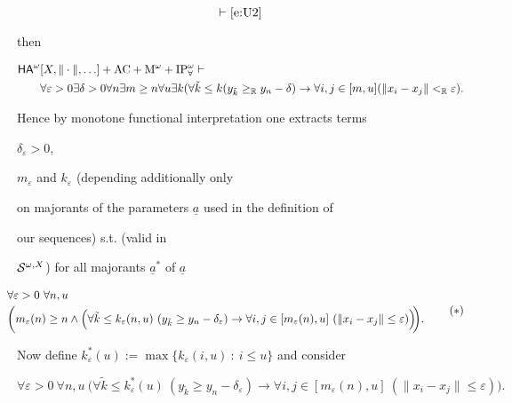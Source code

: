 \documentclass[1p]{elsarticle}
\newcommand{\usftext}[1]{\textsf{\upshape #1}}
\newcommand{\ba}{\begin{array}} \newcommand{\ea}{\end{array}}
\newcommand{\RR}{\ensuremath{\mathbb{R}}}
\newcommand{\ha}{\ensuremath{{\usftext{HA}}^\omega}} %
\theoremstyle{plain}
\theoremstyle{definition}
\theoremstyle{remark}
\renewcommand{\epsilon}{\varepsilon}
\theoremstyle{definition}
\begin{document}
{\[\vdash\text{\eqref{e:U2}}

\]

then

\begin{align*}

\ha&[X,\|\cdot\|,\ldots]+{\rm AC}+{\rm M}^{\omega} +{\rm IP}^\omega_\forall \vdash\\

&\forall\epsilon>0\exists\delta>0\forall n\exists m\geq n\forall u\exists k(\forall \tilde k\le k(y_{\tilde k}\geq_\RR y_n-\delta)

\rightarrow \forall i,j\in[m,u](\|x_i-x_j\|<_\RR\epsilon).

\end{align*}

Hence by monotone functional interpretation one extracts terms 

 $\delta_\epsilon>0$, 

$m_\epsilon$ and $k_\epsilon$ (depending additionally only 

on majorants of the parameters $\underline{a}$ used in the definition of 

our sequences) s.t. (valid in 

${\cal S}^{\omega,X}$) for all majorants $\underline{a}^*$ of $\underline{a}$ 

\[ \hspace*{-5mm} \ba{l} 

\forall \epsilon>0\ \forall n,u\\[1mm] 

\bigg( m_\epsilon(n)\ge n \wedge \Big(\forall \tilde k\le k_\epsilon(n,u)\ (y_{\tilde k}\geq y_n-\delta_\epsilon)\rightarrow 

 \forall i,j\in[m_\epsilon(n),u]\ (\|x_i-x_j\|\leq \epsilon) \Big)

\hspace*{-1mm} \bigg).

\ea  \hspace*{-1mm}\tag{$*$}\label{e:U4-me}\]

Now define $k^*_\epsilon(u):=\max\{k_\epsilon(i,u)\ :\ i\leq u\}$ and consider

\[

\forall \epsilon>0\ \forall n,u\ \Big( \forall \tilde k\le k^*_\epsilon(u)\ (y_{\tilde k}\geq y_n-\delta_\epsilon)\rightarrow 

 \forall i,j\in[m_\epsilon(n),u]\ (\|x_i-x_j\|\leq \epsilon) \Big).

\tag{$**$}\label{e:U4}\]

}
\end{document}

